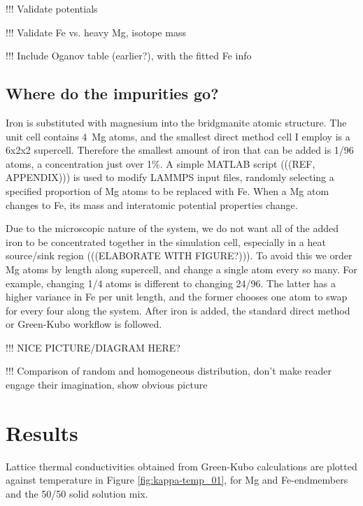 !!! Validate potentials

!!! Validate Fe vs. heavy Mg, isotope mass

!!! Include Oganov table (earlier?), with the fitted Fe info


\subsection{Where do the impurities go?} 

Iron is substituted with magnesium into the bridgmanite atomic structure. The unit cell contains 4~Mg atoms, and the smallest direct method cell I employ is a 6x2x2 supercell. Therefore the smallest amount of iron that can be added is 1/96 atoms, a concentration just over 1\%. A simple MATLAB script (((REF, APPENDIX))) is used to modify LAMMPS input files, randomly selecting a specified proportion of Mg atoms to be replaced with Fe. When a Mg atom changes to Fe, its mass and interatomic potential properties change. 

Due to the microscopic nature of the system, we do not want all of the added iron to be concentrated together in the simulation cell, especially in a heat source/sink region (((ELABORATE WITH FIGURE?))). To avoid this we order Mg atoms by length along supercell, and change a single atom every so many. For example, changing 1/4 atoms is different to changing 24/96. The latter has a higher variance in Fe per unit length, and the former chooses one atom to swap for every four along the system. After iron is added, the standard direct method or Green-Kubo workflow is followed.

!!! NICE PICTURE/DIAGRAM HERE?

!!! Comparison of random and homogeneous distribution, don't make reader engage their imagination, show obvious picture




\section{Results}

Lattice thermal conductivities obtained from Green-Kubo calculations are plotted against temperature in Figure \ref{fig:kappa-temp_01}, for Mg and Fe-endmembers and the 50/50 solid solution mix.

